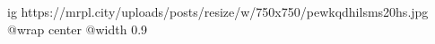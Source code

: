  
 
 
 
 

\ifcmt
  ig https://mrpl.city/uploads/posts/resize/w/750x750/pewkqdhilsms20hs.jpg
  @wrap center
  @width 0.9
\fi
